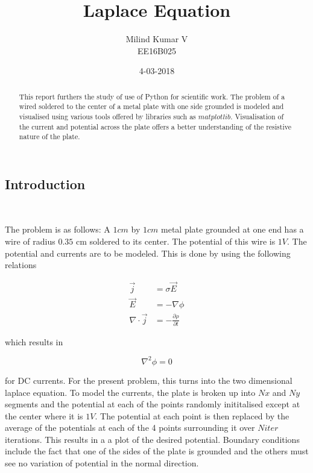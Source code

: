 \documentclass[a4paper, 11pt, margin= 1.25cm]{article}
\title{Laplace Equation}
\date{4-03-2018}
\author{Milind Kumar V\\ EE16B025}
\begin{document}
    
    
    \maketitle
    
    

    \begin{multicols}{2}
    \begin{abstract}\label{abstract}

This report furthers the study of use of Python for scientific work. The
problem of a wired soldered to the center of a metal plate with one side
grounded is modeled and visualised using various tools offered by
libraries such as $matplotlib$. Visualisation of the current and
potential across the plate offers a better understanding of the
resistive nature of the plate.
\end{abstract}
    \section{Introduction}\label{introduction}

    \begin{center}
    \end{center}
    { \hspace*{\fill} \\}

The problem is as follows: A $1cm$ by $1cm$ metal plate grounded at one
end has a wire of radius $0.35$ cm soldered to its center. The potential
of this wire is $1 V$. The potential and currents are to be modeled.
This is done by using the following relations



\begin{align}
\vec{j} &= \sigma\vec{E}\\
\vec{E} &=-\nabla\phi\\
\nabla\cdot\vec{j} &= -\frac{\partial \rho}{\partial t}
\end{align}

which results in

\begin{equation}
\nabla^2\phi=0
\end{equation}

for DC currents. For the present problem, this turns into the two
dimensional laplace equation. To model the currents, the plate is broken
up into $Nx$ and $Ny$ segments and the potential at each of the points
randomly inititalised except at the center where it is $1V$. The
potential at each point is then replaced by the average of the
potentials at each of the 4 points surrounding it over $Niter$
iterations. This results in a a plot of the desired potential. Boundary
conditions include the fact that one of the sides of the plate is
grounded and the others must see no variation of potential in the normal
direction.


\end{multicols}
\end{document}
